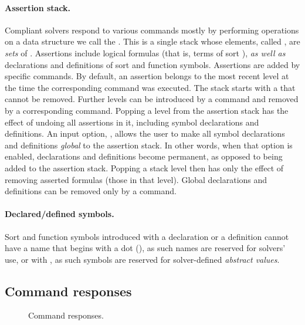\paragraph{Assertion stack.} 
Compliant solvers respond to various commands mostly by performing operations 
on a data structure we call the .  
This is a single stack whose elements, called ,
are \emph{sets} of . 
Assertions include logical formulas (that is, terms of sort ), 
\emph{as well as} declarations and definitions of sort and function symbols.
Assertions are added by specific commands.
By default, an assertion belongs to the most recent level
at the time the corresponding command was executed.
The stack starts with a  
that cannot be removed.
Further levels can be introduced by a  command and 
removed by a corresponding  command.
Popping a level from the assertion stack has the effect of undoing 
all assertions in it, including symbol declarations and definitions.
An input option, , allows the user to make 
all symbol declarations and definitions \emph{global} to the assertion stack.
In other words, when that option is enabled, declarations and definitions become
permanent, as opposed to being added to the assertion stack.
Popping a stack level then has only the effect of removing asserted formulas 
(those in that level).
Global declarations and definitions can be removed only by a  command.

\paragraph{Declared/defined symbols.}
Sort and function symbols introduced with a declaration or a definition
cannot have a name that begins with a dot (), as such names 
are reserved for solvers' use, or with , as such symbols are reserved 
for solver-defined \emph{abstract values}.

\subsection{Command responses}

\begin{figure}
\small

\cResponsesI
\bigskip

\cResponsesII

\caption{Command responses.}
\label{fig:command-responses}
\end{figure}

